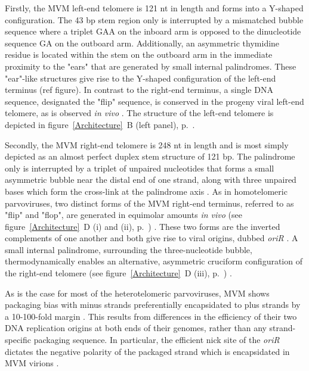 Firstly, the MVM left-end telomere is 121 nt in length and forms into a Y-shaped configuration. The 43 bp stem region only is interrupted by a mismatched bubble sequence where a triplet GAA on the inboard arm is opposed to the dinucleotide sequence GA on the outboard arm. Additionally, an asymmetric thymidine residue is located within the stem on the outboard arm in the immediate proximity to the "ears" that are generated by small internal palindromes. These "ear"-like structures give rise to the Y-shaped configuration of the left-end terminus \cite{pmid225040, pmid6298737, pmid3973977, replication} (ref figure). In contrast to the right-end terminus, a single DNA sequence, designated the "flip" sequence, is conserved in the progeny viral left-end telomere, as is observed \textit{in vivo} \cite{pmid3973977}. The structure of the left-end telomere is depicted in figure~\ref{Architecture}~B (left panel), p.~\pageref{Architecture}. 

Secondly, the MVM right-end telomere is 248 nt in length and is most simply depicted as an almost perfect duplex stem structure of 121 bp. The palindrome only is interrupted by a triplet of unpaired nucleotides that forms a small asymmetric bubble near the distal end of one strand, along with three unpaired bases which form the cross-link at the palindrome axis \cite{pmid6298737, pmid3973977}. As in homotelomeric parvoviruses, two distinct forms of the MVM right-end terminus, referred to as "flip" and "flop", are generated in equimolar amounts \textit{in vivo} (see figure~\ref{Architecture}~D (i) and (ii), p.~\pageref{Architecture}) \cite{telomere2, encapsidation}. These two forms are the inverted complements of one another and both give rise to viral origins, dubbed \textit{oriR} \cite{pmid1388310, pmid9765384, pmid10627544}. A small internal palindrome, surrounding the three-nucleotide bubble, thermodynamically enables an alternative, asymmetric cruciform configuration of the right-end telomere (see figure~\ref{Architecture}~D (iii), p.~\pageref{Architecture}) \cite{pmid6602687}. 


As is the case for most of the heterotelomeric parvoviruses, MVM shows packaging bias with minus strands preferentially encapsidated to plus strands by a 10-100-fold margin \cite{pmid6828378, pmid3296697}. This results from differences in the efficiency of their two DNA replication origins at both ends of their genomes, rather than any strand-specific packaging sequence. In particular, the efficient nick site of the \textit{oriR} dictates the negative polarity of the packaged strand which is encapsidated in MVM virions \cite{pmid15681430}. 

